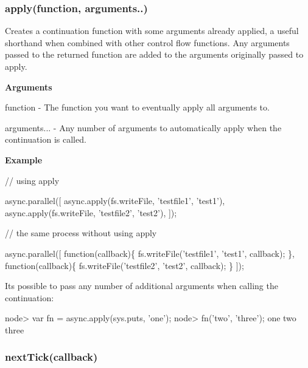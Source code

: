 \label{_apply}%
 \subsubsection*{apply(function, arguments..)}

Creates a continuation function with some arguments already applied, a useful shorthand when combined with other control flow functions. Any arguments passed to the returned function are added to the arguments originally passed to apply.

{\bfseries Arguments}


\begin{DoxyItemize}
\item function -\/ The function you want to eventually apply all arguments to.
\item arguments... -\/ Any number of arguments to automatically apply when the continuation is called.
\end{DoxyItemize}

{\bfseries Example}


\begin{DoxyCode}
\textcolor{comment}{// using apply}

async.parallel([
    async.apply(fs.writeFile, \textcolor{stringliteral}{'testfile1'}, \textcolor{stringliteral}{'test1'}),
    async.apply(fs.writeFile, \textcolor{stringliteral}{'testfile2'}, \textcolor{stringliteral}{'test2'}),
]);


\textcolor{comment}{// the same process without using apply}

async.parallel([
    \textcolor{keyword}{function}(callback)\{
        fs.writeFile(\textcolor{stringliteral}{'testfile1'}, \textcolor{stringliteral}{'test1'}, callback);
    \},
    \textcolor{keyword}{function}(callback)\{
        fs.writeFile(\textcolor{stringliteral}{'testfile2'}, \textcolor{stringliteral}{'test2'}, callback);
    \}
]);
\end{DoxyCode}


It\textquotesingle{}s possible to pass any number of additional arguments when calling the continuation\+:


\begin{DoxyCode}
node> var fn = async.apply(sys.puts, \textcolor{stringliteral}{'one'});
node> fn(\textcolor{stringliteral}{'two'}, \textcolor{stringliteral}{'three'});
one
two
three
\end{DoxyCode}
 



\label{_nextTick}%
 \subsubsection*{next\+Tick(callback)}

